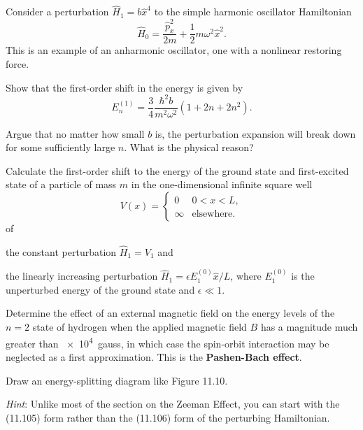 \documentclass {../phys116}
\begin{document}
\begin {exercise} 
  Consider a perturbation \(\hat H_1 = b \hat x^4\) to the simple
  harmonic oscillator Hamiltonian
  \[
    \hat H_0
    = \frac {\hat p_x^2} {2 m}
    + \frac 1 2 m \omega^2 \hat x^2.
  \]
  This is an example of an anharmonic oscillator, one with a nonlinear
  restoring force.
  \begin {problems}
  \item Show that the first-order shift in the energy is given by
    \[
      E_n^{(1)} = \frac 3 4 \frac {\hbar^2 b} {m^2 \omega^2} (1 + 2 n + 2 n^2).
    \]
  \item Argue that no matter how small \(b\) is, the perturbation
    expansion will break down for some sufficiently large \(n\).  What
    is the physical reason?
  \end {problems}
\end {exercise}

\begin {solution}

\end {solution}

\begin {exercise} 
  Calculate the first-order shift to the energy of the ground state
  and first-excited state of a particle of mass \(m\) in the
  one-dimensional infinite square well
  \[
    V(x) =
    \begin {cases}
      0 & 0 < x < L, \\
      \infty & \text {elsewhere}.
    \end {cases}
  \]
  of
  \begin {problems}
  \item the constant perturbation \(\hat H_1 = V_1\) and
  \item the linearly increasing perturbation
    \(\hat H_1 = \epsilon E_1^{(0)} \hat x / L\), where \(E_1^{(0)}\)
    is the unperturbed energy of the ground state and
    \(\epsilon \ll 1\).
  \end {problems}
\end {exercise}

\begin {solution}

\end {solution}

\begin {exercise} 
  Determine the effect of an external magnetic field on the energy
  levels of the \(n=2\) state of hydrogen when the applied magnetic
  field \(B\) has a magnitude much greater than \SI {e4} {gauss}, in
  which case the spin-orbit interaction may be neglected as a first
  approximation.  This is the \textbf {Pashen-Bach effect}.

  Draw an energy-splitting diagram like Figure 11.10.

  \textit {Hint}: Unlike most of the section on the Zeeman Effect, you
  can start with the (11.105) form rather than the (11.106) form of
  the perturbing Hamiltonian.
\end {exercise}

\begin {solution}

\end {solution}
\end{document}
